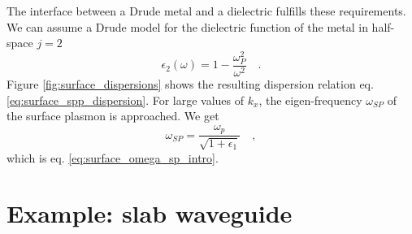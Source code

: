 The interface between a Drude metal and a dielectric fulfills these requirements. We can assume a Drude model for the dielectric function of the metal in half-space $j=2$
\begin{equation}
\epsilon_2(\omega) = 1 - \frac{\omega_P^2}{\omega^2} \quad .
\end{equation}
Figure \ref{fig:surface_dispersions}
 shows the resulting dispersion relation eq. \ref{eq:surface_spp_dispersion}. For large values of $k_x$, the eigen-frequency $\omega_{SP}$ of the surface plasmon is approached.  We get
\begin{equation}
\omega_{SP} = \frac{\omega_p}{\sqrt{1 + \epsilon_1}} \quad ,
\end{equation}
which is eq. \ref{eq:surface_omega_sp_intro}.


\section{Example: slab waveguide}

